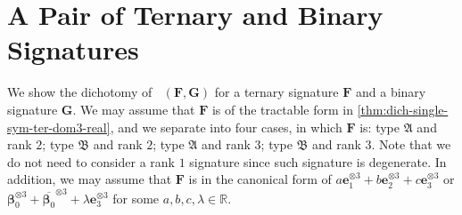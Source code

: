 \documentclass[11pt]{article}
\DeclareMathOperator{\holts}{Holant^*_3}
\newcommand{\teh}{^{\otimes 3}}
\newcommand{\ternarytractgeneq}{$\mathfrak{A}$\xspace}
\newcommand{\ternarytractz}{$\mathfrak{B}$\xspace}
\begin{document}
\section{A Pair of Ternary and Binary Signatures}\label{sec:single-ternary-signle-binary}
We show the dichotomy of $\holts(\mathbf{F}, \mathbf{G})$ for a ternary signature $\mathbf{F}$ and a binary signature $\mathbf{G}$.
We may assume that $\mathbf{F}$ is of the tractable form in \cref{thm:dich-single-sym-ter-dom3-real}, and we separate into four cases, in which $\mathbf{F}$ is: type \ternarytractgeneq and rank $2$; type \ternarytractz and rank $2$; type \ternarytractgeneq and rank $3$; type \ternarytractz and rank $3$.
Note that we do not need to consider a rank $1$ signature since such signature is degenerate.
In addition, we may assume that $\mathbf{F}$ is in the canonical form of $a \mathbf{e}_1 \teh + b \mathbf{e}_2 \teh + c \mathbf{e}_3 \teh$ or $\boldsymbol{\beta}_0\teh + \overline{\boldsymbol{\beta}_0}\teh + \lambda \mathbf{e}_3 \teh$ for some $a, b, c, \lambda \in \mathbb{R}$.
\end{document}

